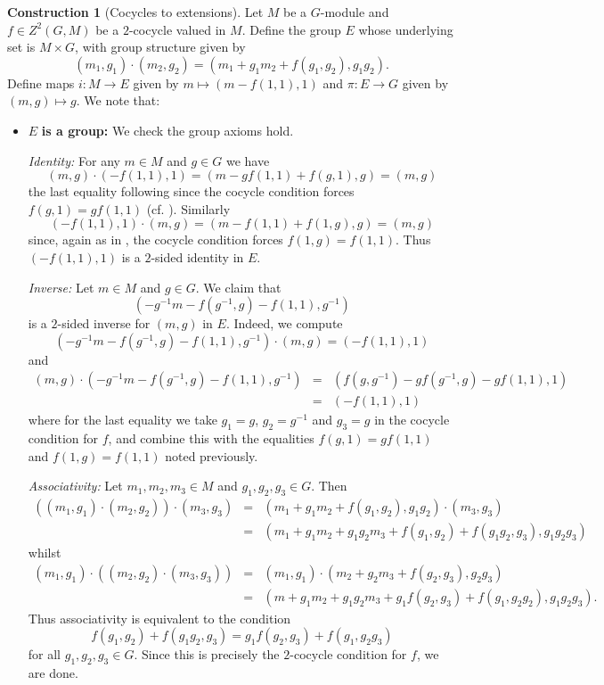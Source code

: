 \documentclass[11pt]{amsart}
\numberwithin{equation}{section}
\theoremstyle{remark}
\theoremstyle{remark}
\theoremstyle{remark}
\theoremstyle{definition}
\theoremstyle{definition}
\newtheorem{construction}[equation]{Construction}
\theoremstyle{definition}
\theoremstyle{definition}
\theoremstyle{definition}
\theoremstyle{definition}
\begin{document}
\begin{construction}[Cocycles to extensions] \label{Cocycles to extensions}
Let $M$ be a $G$-module and $f\in Z^2(G,M)$ be a $2$-cocycle valued in $M$. Define the group $E$ whose underlying set is $M\times G$, with group structure given by
\[(m_1,g_1)\cdot (m_2,g_2)=(m_1+g_1m_2+f(g_1,g_2),g_1g_2).\]
Define maps $i:M\rightarrow E$ given by $m\mapsto (m-f(1,1),1)$ and $\pi:E\rightarrow G$ given by $(m,g)\mapsto g$.
We note that:
\begin{itemize}
\item $E$ \textbf{is a group:} We check the group axioms hold. 

\textit{Identity:} For any $m\in M$ and $g\in G$ we have 
\[(m,g)\cdot (-f(1,1),1)=(m-gf(1,1)+f(g,1),g)=(m,g)\]
the last equality following since the cocycle condition forces $f(g,1)=gf(1,1)$ (cf. ). Similarly 
\[(-f(1,1),1)\cdot (m,g)=(m-f(1,1)+f(1,g),g)=(m,g)\]
since, again as in , the cocycle condition forces $f(1,g)=f(1,1)$.  Thus $(-f(1,1),1)$ is a $2$-sided identity in $E$. 

\textit{Inverse:} Let $m\in M$ and $g\in G$. We claim that
\[(-g^{-1}m-f(g^{-1},g)-f(1,1),g^{-1})\]
is a $2$-sided inverse for $(m,g)$ in $E$. Indeed, we compute
\[(-g^{-1}m-f(g^{-1},g)-f(1,1),g^{-1})\cdot (m,g)=(-f(1,1),1)\] 
and
\begin{eqnarray*}(m,g)\cdot (-g^{-1}m-f(g^{-1},g)-f(1,1),g^{-1})&=&(f(g,g^{-1})-gf(g^{-1},g)-gf(1,1),1)\\
&=&(-f(1,1),1)\end{eqnarray*}
where for the last equality we take $g_1=g$, $g_2=g^{-1}$ and $g_3=g$ in the cocycle condition  for $f$, and combine this with the equalities $f(g,1)=gf(1,1)$ and $f(1,g)=f(1,1)$ noted previously. 

\textit{Associativity:} Let $m_1,m_2,m_3\in M$ and $g_1,g_2,g_3\in G$. Then
\begin{eqnarray*}\left((m_1,g_1)\cdot (m_2,g_2)\right)\cdot (m_3,g_3)&=&(m_1+g_1m_2+f(g_1,g_2),g_1g_2)\cdot (m_3,g_3)\\
&=&(m_1+g_1m_2+g_1g_2m_3+f(g_1,g_2)+f(g_1g_2,g_3),g_1g_2g_3)\end{eqnarray*}
whilst
\begin{eqnarray*}
(m_1,g_1)\cdot \left((m_2,g_2)\cdot (m_3,g_3)\right)&=&(m_1,g_1)\cdot (m_2+g_2m_3+f(g_2,g_3),g_2g_3)\\
&=&(m+g_1m_2+g_1g_2m_3+g_1f(g_2,g_3)+f(g_1,g_2g_2),g_1g_2g_3).
\end{eqnarray*}
Thus associativity is equivalent to the condition
\[f(g_1,g_2)+f(g_1g_2,g_3)=g_1f(g_2,g_3)+f(g_1,g_2g_3)\]
for all $g_1,g_2,g_3\in G$. Since this is precisely the $2$-cocycle condition  for $f$, we are done.


\end{itemize}
\end{construction}
\end{document}
